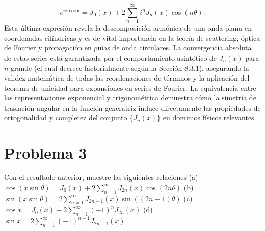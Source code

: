 \documentclass[a4paper]{article}
\begin{document}
$$e^{ix\cos\theta} = J_0(x) + 2 \sum_{n=1}^{\infty} i^n J_n(x) \cos(n\theta).$$
Esta última expresión revela la descomposición armónica de una onda plana en coordenadas cilíndricas y es de vital importancia en la teoría de scattering, óptica de Fourier y propagación en guías de onda circulares. La convergencia absoluta de estas series está garantizada por el comportamiento asintótico de $J_n(x)$ para $n$ grande (el cual decrece factorialmente según la Sección 8.3.1), asegurando la validez matemática de todas las reordenaciones de términos y la aplicación del teorema de unicidad para expansiones en series de Fourier. La equivalencia entre las representaciones exponencial y trigonométrica demuestra cómo la simetría de traslación angular en la función generatriz induce directamente las propiedades de ortogonalidad y completez del conjunto $\{J_n(x)\}$ en dominios físicos relevantes.



\section{Problema 3}
Con el resultado anterior, muestre las siguientes relaciones
(a) $\cos(x \sin \theta)= J_0(x)+ 2\sum_{n=1}^{\infty} J_{2n}(x) \cos(2n\theta)$
(b) $\sin(x \sin \theta)= 2\sum_{n=1}^{\infty} J_{2n-1}(x) \sin((2n - 1)\theta)$
(c) $\cos x= J_0(x)+ 2\sum_{n=1}^{\infty}(-1)^n J_{2n}(x)$
(d) $\sin x= 2\sum_{n=1}^{\infty}(-1)^{n-1} J_{2n-1}(x)$
\end{document}

